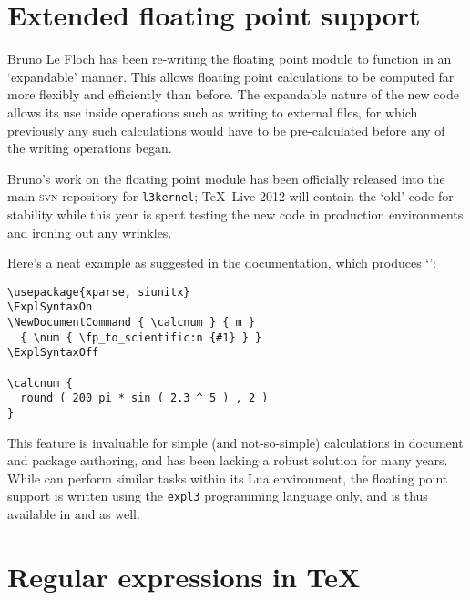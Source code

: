 \documentclass{ltnews}
\begin{document}
\maketitle

\raisefirstsection
\section{Extended floating point support}

Bruno Le Floch has been re-writing the floating point module to function in an `expandable' manner. This allows floating point calculations to be computed far more flexibly and efficiently than before.
The expandable nature of the new code allows its use inside operations such as writing to external files, for which previously any such calculations would have to be pre-calculated before any of the writing operations began.

Bruno's work on the floating point module has been officially released into the main \textsc{svn} repository for \texttt{l3kernel}; \TeX\ Live 2012 will contain the `old' code for stability while this year is spent testing the new code in production environments and ironing out any wrinkles.

Here's a neat example as suggested in the documentation, which produces `':

\begin{verbatim}
\usepackage{xparse, siunitx}
\ExplSyntaxOn
\NewDocumentCommand { \calcnum } { m }
  { \num { \fp_to_scientific:n {#1} } }
\ExplSyntaxOff

\calcnum {
  round ( 200 pi * sin ( 2.3 ^ 5 ) , 2 )
}
\end{verbatim}

This feature is invaluable for simple (and not-so-simple) calculations in document and package authoring, and has been lacking a robust solution for many years.
While  can perform similar tasks within its Lua environment, the floating point support is written using the \texttt{expl3} programming language only, and is thus available in  and  as well.

\section{Regular expressions in \TeX}
\end{document}
